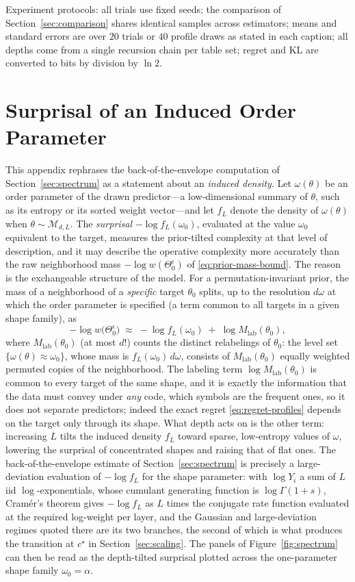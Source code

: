 \documentclass[11pt]{article}
\newcommand{\op}{\omega}             %
\newcommand{\Mlab}{M_{\mathrm{lab}}} %
\begin{document}
Experiment protocols: all trials use fixed seeds; the comparison of
Section~\ref{sec:comparison} shares identical samples across estimators;
means and standard errors are over \(20\) trials or \(40\) profile draws
as stated in each caption; all depths come from a single recursion chain
per table set; regret and KL are converted to bits by division by
\(\ln2\).

\section{Surprisal of an Induced Order Parameter}
\label{sec:app-surprisal}
This appendix rephrases the back-of-the-envelope computation of
Section~\ref{sec:spectrum} as a statement about an \emph{induced density}.
Let $\op(\theta)$ be an order parameter of the drawn predictor---a
low-dimensional summary of $\theta$, such as its entropy or its sorted
weight vector---and let $f_L$ denote the density of $\op(\theta)$ when
$\theta \sim \mathcal{M}_{d,L}$.  The \emph{surprisal} \(-\log f_L(\op_0)\),
evaluated at the value \(\op_0\) equivalent to the target, measures the
prior-tilted complexity at that level of description, and it may describe
the operative complexity more accurately than the raw neighborhood mass
\(-\log w(\Theta_0^{\epsilon})\) of \eqref{eq:prior-mass-bound}.  The reason
is the exchangeable structure of the model.  For a permutation-invariant
prior, the mass of a neighborhood of a \emph{specific} target \(\theta_0\)
splits, up to the resolution \(d\op\) at which the order parameter is
specified (a term common to all targets in a given shape family), as
\[
  -\log w\bigl(\Theta_0^{\epsilon}\bigr)
  \;\approx\;
  -\log f_L(\op_0)\;+\;\log \Mlab(\theta_0),
\]
where \(\Mlab(\theta_0)\) (at most \(d!\)) counts the distinct relabelings
of \(\theta_0\): the level set \(\{\op(\theta)\approx\op_0\}\), whose mass
is \(f_L(\op_0)\,d\op\), consists of \(\Mlab(\theta_0)\) equally weighted
permuted copies of the neighborhood.  The labeling term
\(\log \Mlab(\theta_0)\) is common to every target of the same shape, and
it is exactly the information that the data must convey under \emph{any}
code, which symbols are the frequent ones, so it does not separate
predictors; indeed the exact regret \eqref{eq:regret-profiles} depends on
the target only through its shape.  What depth acts on is the other term:
increasing \(L\) tilts the induced density \(f_L\) toward sparse,
low-entropy values of \(\op\), lowering the surprisal of concentrated
shapes and raising that of flat ones.  The back-of-the-envelope estimate of
Section~\ref{sec:spectrum} is precisely a large-deviation evaluation of
\(-\log f_L\) for the shape parameter: with \(\log Y_i\) a sum of \(L\) iid
\(\log\)-exponentials, whose cumulant generating function is
\(\log\Gamma(1+s)\), Cram\'er's theorem gives \(-\log f_L\) as \(L\) times
the conjugate rate function evaluated at the required log-weight per layer,
and the Gaussian and large-deviation regimes quoted there are its two
branches, the second of which is what produces the transition at
\(c^\star\) in Section~\ref{sec:scaling}.  The panels of
Figure~\ref{fig:spectrum} can then be read as the depth-tilted surprisal
plotted across the one-parameter shape family \(\op_0=\alpha\).
\end{document}
